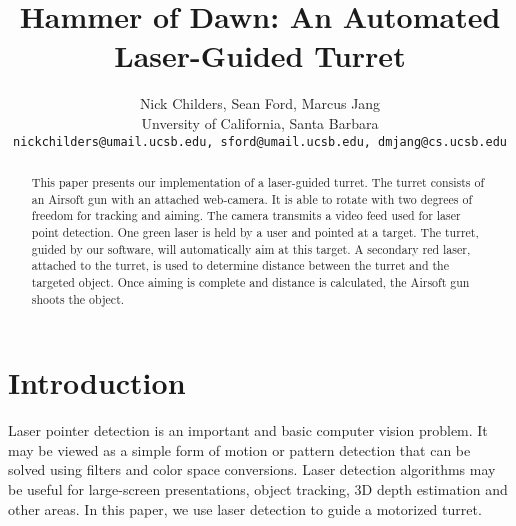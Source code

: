 \documentclass[10pt,twocolumn,letterpaper]{article}
\begin{document}
\title{Hammer of Dawn: An Automated Laser-Guided Turret}

\author{Nick Childers, Sean Ford, Marcus Jang\\
Unversity of California, Santa Barbara\\
{\tt\small nickchilders@umail.ucsb.edu, sford@umail.ucsb.edu, dmjang@cs.ucsb.edu}
}

\maketitle
\thispagestyle{empty}

\begin{abstract}
This paper presents our implementation of a laser-guided turret. The turret consists of an Airsoft gun with an attached web-camera.  It is able to rotate with two degrees of freedom for tracking and aiming.  The camera transmits a video feed used for laser point detection.  One green laser is held by a user and pointed at a target.  The turret, guided by our software, will automatically aim at this target.  A secondary red laser, attached to the turret, is used to determine distance between the turret and the targeted object.  Once aiming is complete and distance is calculated, the Airsoft gun shoots the object.
\end{abstract}

\section{Introduction}

Laser pointer detection is an important and basic computer vision problem.  It may be viewed as a simple form of motion or pattern detection that can be solved using filters and color space conversions.  Laser detection algorithms may be useful for large-screen presentations, object tracking, 3D depth estimation and other areas.  In this paper, we use laser detection to guide a motorized turret.
\end{document}
